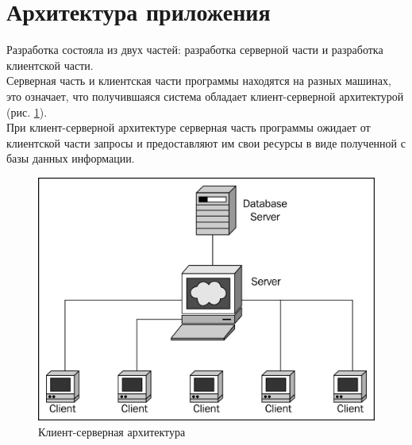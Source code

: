 \documentclass[14pt,final]{report}
\begin{document}
\section{Архитектура приложения}
Разработка состояла из двух частей: разработка серверной части и разработка
клиентской части.\\
Серверная часть и клиентская части программы находятся на разных машинах, это означает, что получившаяся система обладает клиент-серверной архитектурой (рис. \ref{architect}).\\
При клиент-серверной архитектуре серверная часть программы ожидает от клиентской части
запросы и предоставляют им свои ресурсы в виде полученной с базы данных информации.

\begin{figure}[h]
\centering
\includegraphics[scale=0.4 ]{architecture.jpg}
\caption{Клиент-серверная архитектура}
\label{architect}
\end{figure}

\newpage
\end{document}
